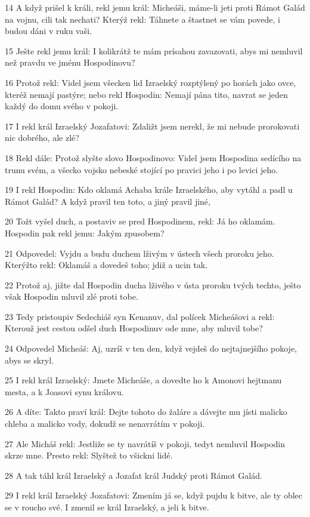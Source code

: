 \par 14 A když prišel k králi, rekl jemu král: Micheáši, máme-li jeti proti Rámot Galád na vojnu, cili tak nechati? Kterýž rekl: Táhnete a štastnet se vám povede, i budou dáni v ruku vaši.
\par 15 Ješte rekl jemu král: I kolikrátž te mám prísahou zavazovati, abys mi nemluvil než pravdu ve jménu Hospodinovu?
\par 16 Protož rekl: Videl jsem všecken lid Izraelský rozptýlený po horách jako ovce, kteréž nemají pastýre; nebo rekl Hospodin: Nemají pána tito, navrat se jeden každý do domu svého v pokoji.
\par 17 I rekl král Izraelský Jozafatovi: Zdaližt jsem nerekl, že mi nebude prorokovati nic dobrého, ale zlé?
\par 18 Rekl dále: Protož slyšte slovo Hospodinovo: Videl jsem Hospodina sedícího na trunu svém, a všecko vojsko nebeské stojící po pravici jeho i po levici jeho.
\par 19 I rekl Hospodin: Kdo oklamá Achaba krále Izraelského, aby vytáhl a padl u Rámot Galád? A když pravil ten toto, a jiný pravil jiné,
\par 20 Tožt vyšel duch, a postaviv se pred Hospodinem, rekl: Já ho oklamám. Hospodin pak rekl jemu: Jakým zpusobem?
\par 21 Odpovedel: Vyjdu a budu duchem lživým v ústech všech proroku jeho. Kterýžto rekl: Oklamáš a dovedeš toho; jdiž a ucin tak.
\par 22 Protož aj, jižte dal Hospodin ducha lživého v ústa proroku tvých techto, ješto však Hospodin mluvil zlé proti tobe.
\par 23 Tedy pristoupiv Sedechiáš syn Kenanuv, dal polícek Micheášovi a rekl: Kterouž jest cestou odšel duch Hospodinuv ode mne, aby mluvil tobe?
\par 24 Odpovedel Micheáš: Aj, uzríš v ten den, když vejdeš do nejtajnejšího pokoje, abys se skryl.
\par 25 I rekl král Izraelský: Jmete Micheáše, a dovedte ho k Amonovi hejtmanu mesta, a k Joasovi synu královu.
\par 26 A díte: Takto praví král: Dejte tohoto do žaláre a dávejte mu jísti malicko chleba a malicko vody, dokudž se nenavrátím v pokoji.
\par 27 Ale Micháš rekl: Jestliže se ty navrátíš v pokoji, tedyt nemluvil Hospodin skrze mne. Presto rekl: Slyštež to všickni lidé.
\par 28 A tak táhl král Izraelský a Jozafat král Judský proti Rámot Galád.
\par 29 I rekl král Izraelský Jozafatovi: Zmením já se, když pujdu k bitve, ale ty oblec se v roucho své. I zmenil se král Izraelský, a jeli k bitve.
